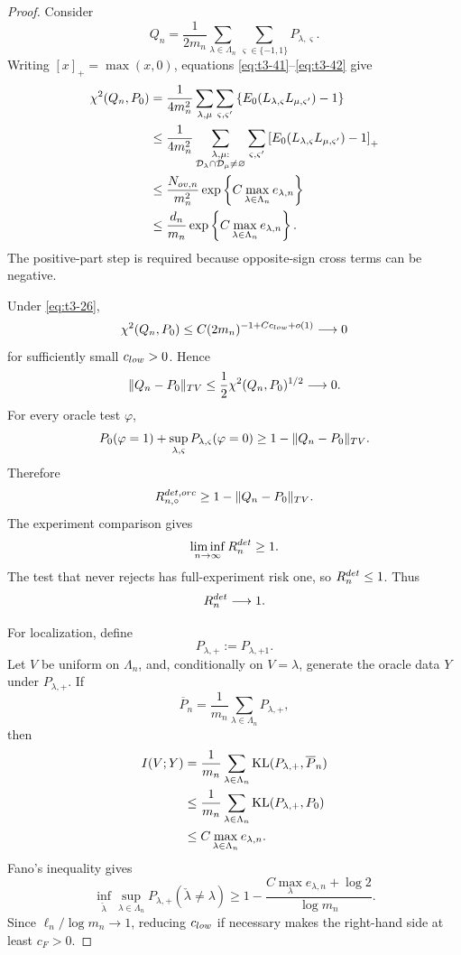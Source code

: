 \documentclass[10pt,a4paper]{amsart}
\begin{document}
\begin{proof}
Consider
\[
Q_n
=
\frac1{2m_n}
\sum_{\lambda\in\Lambda_n}
\sum_{\varsigma\in\{-1,1\}}
P_{\lambda,\varsigma}.
\]
Writing \([x]_+=\max(x,0)\), equations
\eqref{eq:t3-41}--\eqref{eq:t3-42} give
\begin{align}
\chi^2(Q_n,P_0)
&=
\frac1{4m_n^2}
\sum_{\lambda,\mu}
\sum_{\varsigma,\varsigma'}
\left\{
E_0
(L_{\lambda,\varsigma}L_{\mu,\varsigma'})
-1
\right\}
\notag\\
&\le
\frac1{4m_n^2}
\sum_{\substack{\lambda,\mu:\\
\mathcal D_\lambda\cap\mathcal D_\mu\ne\varnothing}}
\sum_{\varsigma,\varsigma'}
\left[
E_0
(L_{\lambda,\varsigma}L_{\mu,\varsigma'})
-1
\right]_+
\notag\\
&\le
\frac{N_{{\rm ov},n}}{m_n^2}
\exp\left\{
C\max_{\lambda\in\Lambda_n}e_{\lambda,n}
\right\}
\notag\\
&\le
\frac{d_n}{m_n}
\exp\left\{
C\max_{\lambda\in\Lambda_n}e_{\lambda,n}
\right\}.
\label{eq:t3-43}
\end{align}
The positive-part step is required because opposite-sign cross terms
can be negative.

Under \eqref{eq:t3-26},
\[
\chi^2(Q_n,P_0)
\le
C(2m_n)^{-1+Cc_{\rm low}+o(1)}
\longrightarrow0
\]
for sufficiently small \(c_{\rm low}>0\).  Hence
\[
\|Q_n-P_0\|_{\rm TV}
\le
\frac12\chi^2(Q_n,P_0)^{1/2}
\longrightarrow0.
\]
For every oracle test \(\varphi\),
\[
P_0(\varphi=1)
+
\sup_{\lambda,\varsigma}
P_{\lambda,\varsigma}(\varphi=0)
\ge
1-\|Q_n-P_0\|_{\rm TV}.
\]
Therefore
\[
R_{n,\circ}^{\rm det,orc}
\ge
1-\|Q_n-P_0\|_{\rm TV}.
\]
The experiment comparison gives
\[
\liminf_{n\to\infty}R_n^{\rm det}\ge1.
\]
The test that never rejects has full-experiment risk one, so
\(R_n^{\rm det}\le1\).  Thus
\[
R_n^{\rm det}\longrightarrow1.
\]

For localization, define
\[
P_{\lambda,+}:=P_{\lambda,+1}.
\]
Let \(V\) be uniform on \(\Lambda_n\), and, conditionally on
\(V=\lambda\), generate the oracle data \(Y\) under \(P_{\lambda,+}\).
If
\[
\overline P_n
=
\frac1{m_n}
\sum_{\lambda\in\Lambda_n}P_{\lambda,+},
\]
then
\begin{align}
I(V;Y)
&=
\frac1{m_n}
\sum_{\lambda\in\Lambda_n}
\operatorname{KL}(P_{\lambda,+},\overline P_n)
\notag\\
&\le
\frac1{m_n}
\sum_{\lambda\in\Lambda_n}
\operatorname{KL}(P_{\lambda,+},P_0)
\notag\\
&\le
C\max_{\lambda\in\Lambda_n}e_{\lambda,n}.
\label{eq:t3-44}
\end{align}
Fano's inequality gives
\begin{equation}
\inf_{\check\lambda}
\sup_{\lambda\in\Lambda_n}
P_{\lambda,+}(\check\lambda\ne\lambda)
\ge
1-
\frac{
C\max_\lambda e_{\lambda,n}+\log2
}{
\log m_n
}.
\label{eq:t3-45}
\end{equation}
Since \(\ell_n/\log m_n\to1\), reducing \(c_{\rm low}\) if necessary
makes the right-hand side at least \(c_F>0\).


\end{proof}
\end{document}
